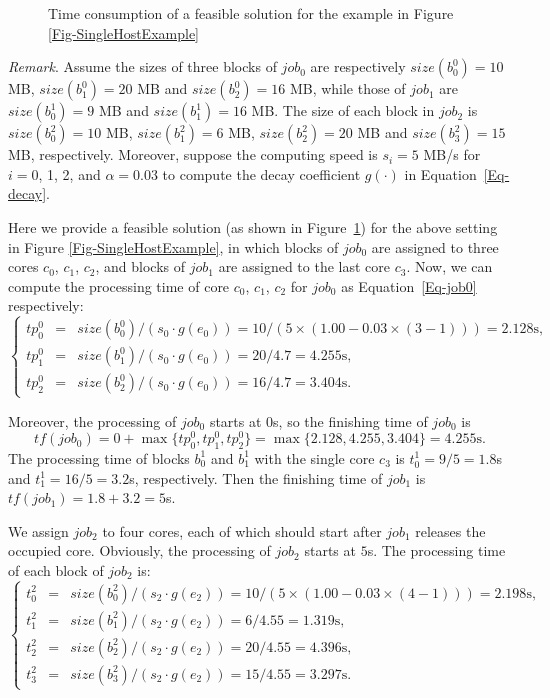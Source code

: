 \documentclass{llncs}
\begin{document}
\begin{figure}[htbp]
\begin{minipage}[t]{0.6\textwidth}
\caption{Time consumption of a feasible solution for the example in Figure \ref{Fig-SingleHostExample}}
\label{Fig-SingleHostResult}
\end{minipage}
\end{figure}


\emph{Remark}. Assume the sizes of three blocks of $job_0$ are respectively $size(b^0_0)=10$ MB, $size(b^0_1)=20$ MB and $size(b^0_2) = 16$ MB, while those of $job_1$ are $size(b^1_0) = 9$ MB and $size(b^1_1) = 16$ MB. The size of each block in $job_2$ is $size(b^2_0) = 10$ MB, $size(b^2_1) = 6$ MB, $size(b^2_2) = 20$ MB and $size(b^2_3) = 15$ MB, respectively. Moreover, suppose the computing speed is $s_i=5$ MB/s for $i = 0$, 1, 2, and $\alpha = 0.03$ to compute the decay coefficient $g(\cdot)$ in Equation~\eqref{Eq-decay}.

Here we provide a feasible solution (as shown in Figure~\ref{Fig-SingleHostResult}) for the above setting in Figure \ref{Fig-SingleHostExample}, in which blocks of $job_0$ are assigned to three cores $c_0$, $c_1$, $c_2$, and blocks of $job_1$ are assigned to the last core $c_3$. Now, we can compute the processing time of core $c_0$, $c_1$, $c_2$ for $job_0$ as Equation~\eqref{Eq-job0} respectively:
\begin{equation} \label{Eq-job0}
\left\{
\begin{array}{ccl}
 tp^0_0  & = &  size(b_0^0)/(s_0\cdot g(e_0))=10 / (5 \times (1.00 - 0.03 \times (3-1))) = 2.128\text{s},\\
 tp^0_1  & = & size(b_1^0)/(s_0\cdot g(e_0)) = 20/4.7 = 4.255\text{s},\\
 tp^0_2 & = & size(b_2^0)/(s_0\cdot g(e_0)) = 16/4.7 = 3.404\text{s}.
\end{array}
\right.
\end{equation}

Moreover, the processing of $job_0$ starts at $0$s, so the finishing time of $job_0$ is $$tf(job_0) =0+ \max \{ tp^0_0, tp^0_1, tp^0_2\} = \max \{2.128, 4.255, 3.404\} = 4.255\text{s}.$$ The processing time of blocks $b^1_0$ and $b^1_1$ with the single core $c_3$ is $t^1_0 = 9/5 = 1.8$s and $t^1_1 = 16/5 = 3.2$s, respectively. Then the finishing time of $job_1$ is $tf(job_1) = 1.8 + 3.2 = 5$s.

We assign $job_2$ to four cores, each of which should start after $job_1$ releases the occupied core. Obviously, the processing of $job_2$ starts at $5$s. The processing time of each block of $job_2$ is: 
\begin{equation*}
\left\{
\begin{array}{ccl}
 t^2_0 & = & size(b^2_0)/(s_2\cdot g(e_2))=10 / (5 \times (1.00 - 0.03 \times (4-1))) = 2.198\text{s},  \\
 t^2_1 & = & size(b^2_1)/(s_2\cdot g(e_2)) = 6/4.55 = 1.319\text{s}, \\
 t^2_2 & = & size(b^2_2)/(s_2\cdot g(e_2))= 20/4.55 = 4.396\text{s}, \\
 t^2_3 & = & size(b^2_3)/(s_2\cdot g(e_2))= 15/4.55 = 3.297\text{s}.
\end{array}
\right.
\end{equation*}
\end{document}
